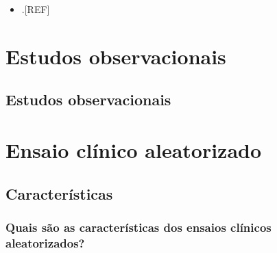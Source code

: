 \documentclass[
  a4paper,
]{book}
\providecommand{\tightlist}{%
  \setlength{\itemsep}{0pt}\setlength{\parskip}{0pt}}
\begin{document}
\begin{itemize}
\tightlist
\item
  .{[}REF{]}
\end{itemize}

\hypertarget{estudos-observacionais}{%
\chapter{\texorpdfstring{\textbf{Estudos observacionais}}{Estudos observacionais}}\label{estudos-observacionais}}

\hypertarget{observacionais}{%
\section{Estudos observacionais}\label{observacionais}}

\hypertarget{ensaio-cluxednico-aleatorizado}{%
\chapter{\texorpdfstring{\textbf{Ensaio clínico aleatorizado}}{Ensaio clínico aleatorizado}}\label{ensaio-cluxednico-aleatorizado}}

\hypertarget{caracteristicas}{%
\section{Características}\label{caracteristicas}}

\hypertarget{quais-suxe3o-as-caracteruxedsticas-dos-ensaios-cluxednicos-aleatorizados}{%
\subsection{Quais são as características dos ensaios clínicos aleatorizados?}\label{quais-suxe3o-as-caracteruxedsticas-dos-ensaios-cluxednicos-aleatorizados}}
\end{document}
